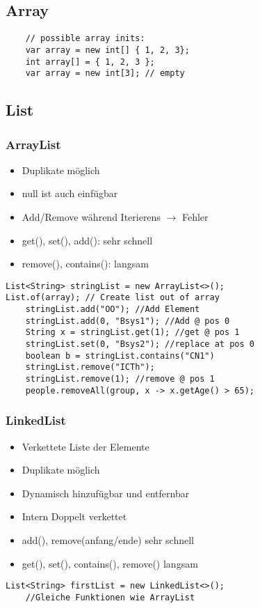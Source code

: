\begin{multicols*}{5}
	\subsection{Array}
		\begin{lstlisting}
	// possible array inits:
	var array = new int[] { 1, 2, 3};
	int array[] = { 1, 2, 3 };
	var array = new int[3]; // empty
		\end{lstlisting}
	
	\subsection{List}
		\subsubsection{ArrayList}
			\begin{itemize}
				\item Duplikate möglich
				\item null ist auch einfügbar
				\item Add/Remove während Iterierens $\rightarrow$ Fehler
				\item get(), set(), add(): sehr schnell
				\item remove(), contains(): langsam
			\end{itemize}
			\begin{lstlisting}
List<String> stringList = new ArrayList<>();
List.of(array); // Create list out of array
	stringList.add("OO"); //Add Element
	stringList.add(0, "Bsys1"); //Add @ pos 0
	String x = stringList.get(1); //get @ pos 1
	stringList.set(0, "Bsys2"); //replace at pos 0
	boolean b = stringList.contains("CN1")
	stringList.remove("ICTh");
	stringList.remove(1); //remove @ pos 1
	people.removeAll(group, x -> x.getAge() > 65);
			\end{lstlisting}

		\subsubsection{LinkedList}
		\begin{itemize}
			\item Verkettete Liste der Elemente
			\item Duplikate möglich
			\item Dynamisch hinzufügbar und entfernbar
			\item Intern Doppelt verkettet
			\item add(), remove(anfang/ende) sehr schnell
			\item get(), set(), contains(), remove() langsam
		\end{itemize}
		\begin{lstlisting}
List<String> firstList = new LinkedList<>();
	//Gleiche Funktionen wie ArrayList
		\end{lstlisting}
	

\end{multicols*}
